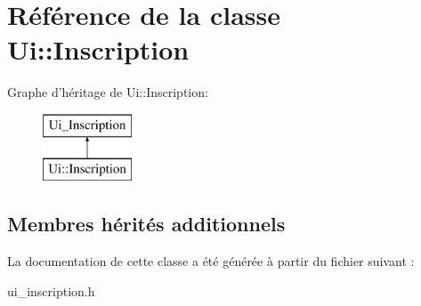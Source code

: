\hypertarget{class_ui_1_1_inscription}{\section{Référence de la classe Ui\+:\+:Inscription}
\label{class_ui_1_1_inscription}
}
Graphe d'héritage de Ui\+:\+:Inscription\+:\begin{figure}[H]
\begin{center}
\leavevmode
\includegraphics[height=2.000000cm]{class_ui_1_1_inscription}
\end{center}
\end{figure}
\subsection*{Membres hérités additionnels}


La documentation de cette classe a été générée à partir du fichier suivant \+:\begin{DoxyCompactItemize}
\item 
ui\+\_\+inscription.\+h\end{DoxyCompactItemize}
